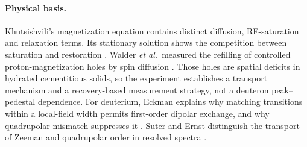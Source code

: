 \documentclass[11pt]{article}
\begin{document}
\paragraph{Physical basis.}
Khutsishvili's magnetization equation contains distinct diffusion, RF-saturation and relaxation
terms. Its stationary solution shows the competition between saturation and restoration
\cite[Eqs.~(3) and (12)]{Khutsishvili1962}. Walder \emph{et al.}\ measured the refilling of
controlled proton-magnetization holes by spin diffusion \cite{Walder2019}. Those holes are
spatial deficits in hydrated cementitious solids, so the experiment establishes a transport
mechanism and a recovery-based measurement strategy, not a deuteron peak--pedestal dependence.
For deuterium, Eckman explains why matching transitions within a local-field width permits
first-order dipolar exchange, and why quadrupolar mismatch suppresses it
\cite[Sec.~III.G]{Eckman1982}. Suter and Ernst distinguish the transport of Zeeman and
quadrupolar order in resolved spectra \cite{SuterErnst1985}.
\end{document}
